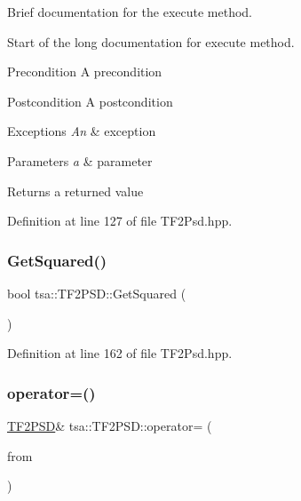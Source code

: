 Brief documentation for the execute method. 

Start of the long documentation for execute method.

\begin{DoxyPrecond}{Precondition}
A precondition 
\end{DoxyPrecond}
\begin{DoxyPostcond}{Postcondition}
A postcondition 
\end{DoxyPostcond}

\begin{DoxyExceptions}{Exceptions}
{\em An} & exception\\
\hline
\end{DoxyExceptions}

\begin{DoxyParams}{Parameters}
{\em a} & parameter\\
\hline
\end{DoxyParams}
\begin{DoxyReturn}{Returns}
a returned value 
\end{DoxyReturn}


Definition at line 127 of file T\+F2\+Psd.\+hpp.

\mbox{\label{classtsa_1_1_t_f2_p_s_d_a1299b56268f7c194f605e497b0d3faae}} 
\subsubsection{\texorpdfstring{Get\+Squared()}{GetSquared()}}
{\footnotesize\ttfamily bool tsa\+::\+T\+F2\+P\+S\+D\+::\+Get\+Squared (\begin{DoxyParamCaption}{ }\end{DoxyParamCaption})\hspace{0.3cm}{\ttfamily [inline]}}



Definition at line 162 of file T\+F2\+Psd.\+hpp.

\mbox{\label{classtsa_1_1_t_f2_p_s_d_a27a169e96e34605ccd463ca3f66e2cd1}} 
\subsubsection{\texorpdfstring{operator=()}{operator=()}}
{\footnotesize\ttfamily \hyperlink{classtsa_1_1_t_f2_p_s_d}{T\+F2\+P\+SD}\& tsa\+::\+T\+F2\+P\+S\+D\+::operator= (\begin{DoxyParamCaption}\item[{const \hyperlink{classtsa_1_1_t_f2_p_s_d}{T\+F2\+P\+SD} \&}]{from }\end{DoxyParamCaption})\hspace{0.3cm}{\ttfamily [inline]}}

